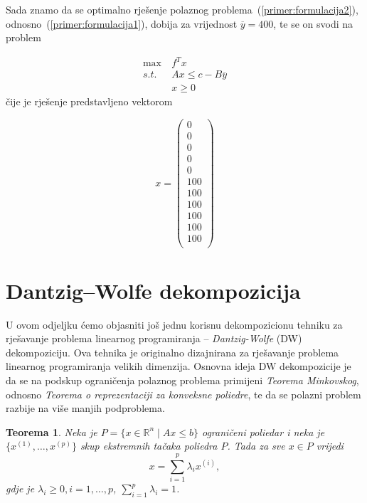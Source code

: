 \documentclass[a4paper, utf8, 11pt, colorlinks]{book}
\newtheorem{thm}{Teorema}[chapter]
\theoremstyle{definition}
\begin{document}
Sada znamo da se optimalno rješenje polaznog problema~(\ref{primer:formulacija2}), odnosno~(\ref{primer:formulacija1}), dobija za vrijednost $\overline{y}=400$, te se on svodi na problem

 \begin{equation}\label{primer:formulacija3}
	\begin{aligned}
		\max\  &f^Tx\\
		s.t.\  &Ax\leqslant c-B\overline{y}\\
		&x\geqslant 0
	\end{aligned}
\end{equation}
čije je rješenje predstavljeno vektorom

$$x =\left(\begin{array}{c}
	0\\
	0\\
	0\\
	0\\
	0\\
	100\\
	100\\
	100\\
	100\\
	100\\
	100\\
\end{array}\right)$$



  \section{Dantzig--Wolfe dekompozicija}%
 
 U ovom odjeljku ćemo objasniti još jednu korisnu dekompozicionu tehniku za rješavanje problema linearnog programiranja -- \emph{Dantzig-Wolfe} (DW) dekompoziciju. Ova tehnika je originalno dizajnirana za rješavanje problema linearnog programiranja velikih dimenzija. Osnovna ideja DW dekompozicije je da se na podskup ograničenja polaznog problema primijeni \emph{Teorema Minkovskog}, odnosno \emph{Teorema o reprezentaciji za konveksne poliedre}, te da se polazni problem razbije na   više manjih podproblema.
 
 \begin{thm}
 	Neka je $P = \{ x \in \mathbb{R}^n \mid Ax \leq b\}$ ograničeni poliedar i neka je $\{x^{(1)}, \ldots, x^{(p)} \}$ skup ekstremnih tačaka poliedra $P$. Tada za sve $x \in P$ vrijedi 
 	 $$ x = \sum_{i=1}^p \lambda_i x^{(i)},$$ 
 	 gdje je $\lambda_i \geq 0,i=1,\ldots,p$, $\sum_{i=1}^p \lambda_i=1$.
 \end{thm}
 
\end{document}
